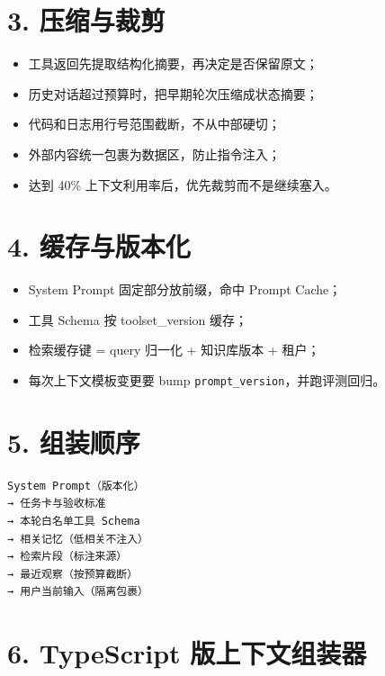 \documentclass[9pt,a4paper,twocolumn]{ctexart}
\begin{document}
\section*{3. 压缩与裁剪}

\begin{itemize}[itemsep=1pt, topsep=2pt]
  \item 工具返回先提取结构化摘要，再决定是否保留原文；
  \item 历史对话超过预算时，把早期轮次压缩成状态摘要；
  \item 代码和日志用行号范围截断，不从中部硬切；
  \item 外部内容统一包裹为数据区，防止指令注入；
  \item 达到 40\% 上下文利用率后，优先裁剪而不是继续塞入。
\end{itemize}


\section*{4. 缓存与版本化}

\begin{itemize}[itemsep=1pt, topsep=2pt]
  \item System Prompt 固定部分放前缀，命中 Prompt Cache；
  \item 工具 Schema 按 toolset\_version 缓存；
  \item 检索缓存键 = query 归一化 + 知识库版本 + 租户；
  \item 每次上下文模板变更要 bump \texttt{prompt\_version}，并跑评测回归。
\end{itemize}


\section*{5. 组装顺序}


\begin{lstlisting}
System Prompt（版本化）
→ 任务卡与验收标准
→ 本轮白名单工具 Schema
→ 相关记忆（低相关不注入）
→ 检索片段（标注来源）
→ 最近观察（按预算截断）
→ 用户当前输入（隔离包裹）
\end{lstlisting}



\section*{6. TypeScript 版上下文组装器}
\end{document}
